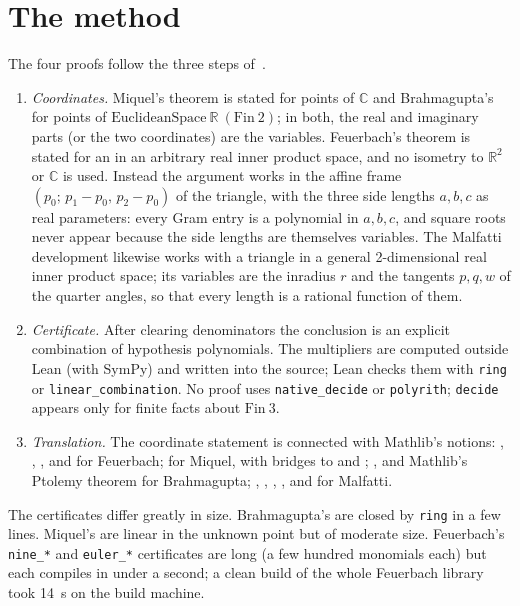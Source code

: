 \documentclass[11pt]{article}
\theoremstyle{definition}
\theoremstyle{remark}
\newcommand{\lean}[1]{\texttt{#1}}
\newcommand{\RR}{\mathbb{R}}
\newcommand{\CC}{\mathbb{C}}
\begin{document}
\section{The method}\label{sec:method}

The four proofs follow the three steps of~\cite{PaperA}.
\begin{enumerate}
\item \emph{Coordinates.} Miquel's theorem is stated for points of $\CC$ and Brahmagupta's for
points of $\mathrm{EuclideanSpace}\ \RR\ (\mathrm{Fin}\ 2)$; in both, the real and imaginary parts
(or the two coordinates) are the variables. Feuerbach's theorem is stated for an
 in an arbitrary real inner product space, and no isometry to $\RR^2$ or
$\CC$ is used. Instead the argument works in the affine frame $(p_0;\,p_1-p_0,\,p_2-p_0)$ of the
triangle, with the three side lengths $a,b,c$ as real parameters: every Gram entry is a polynomial
in $a,b,c$, and square roots never appear because the side lengths are themselves variables.
The Malfatti development likewise works with a triangle in a general 2-dimensional real inner
product space; its variables are the inradius $r$ and the tangents $p,q,w$ of the quarter angles,
so that every length is a rational function of them.
\item \emph{Certificate.} After clearing denominators the conclusion is an explicit combination of
hypothesis polynomials. The multipliers are computed outside Lean (with SymPy) and written into the
source; Lean checks them with \lean{ring} or \lean{linear\_combination}. No proof uses
\lean{native\_decide} or \lean{polyrith}; \lean{decide} appears only for finite facts about
$\mathrm{Fin}\ 3$.
\item \emph{Translation.} The coordinate statement is connected with Mathlib's notions:
, ,
,  and
 for Feuerbach;  for Miquel, with bridges to
 and ; ,
 and Mathlib's Ptolemy theorem for Brahmagupta; ,
, ,
,  and
 for Malfatti.
\end{enumerate}
The certificates differ greatly in size. Brahmagupta's are closed by \lean{ring} in a few lines.
Miquel's are linear in the unknown point but of moderate size. Feuerbach's \lean{nine\_*} and
\lean{euler\_*} certificates are long (a few hundred monomials each) but each compiles in under a
second; a clean build of the whole Feuerbach library took 14~s on the build machine.
\end{document}
